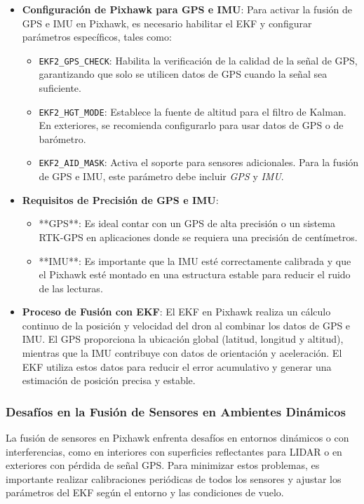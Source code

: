     \begin{itemize}
        \item \textbf{Configuración de Pixhawk para GPS e IMU}: Para activar la fusión de GPS e IMU en Pixhawk, es necesario habilitar el EKF y configurar parámetros específicos, tales como:
            \begin{itemize}
                \item \texttt{EKF2\_GPS\_CHECK}: Habilita la verificación de la calidad de la señal de GPS, garantizando que solo se utilicen datos de GPS cuando la señal sea suficiente.
                \item \texttt{EKF2\_HGT\_MODE}: Establece la fuente de altitud para el filtro de Kalman. En exteriores, se recomienda configurarlo para usar datos de GPS o de barómetro.
                \item \texttt{EKF2\_AID\_MASK}: Activa el soporte para sensores adicionales. Para la fusión de GPS e IMU, este parámetro debe incluir \textit{GPS} y \textit{IMU}.
            \end{itemize}
            
        \item \textbf{Requisitos de Precisión de GPS e IMU}: 
            \begin{itemize}
                \item **GPS**: Es ideal contar con un GPS de alta precisión o un sistema RTK-GPS en aplicaciones donde se requiera una precisión de centímetros.
                \item **IMU**: Es importante que la IMU esté correctamente calibrada y que el Pixhawk esté montado en una estructura estable para reducir el ruido de las lecturas.
            \end{itemize}
            
        \item \textbf{Proceso de Fusión con EKF}: 
            El EKF en Pixhawk realiza un cálculo continuo de la posición y velocidad del dron al combinar los datos de GPS e IMU. El GPS proporciona la ubicación global (latitud, longitud y altitud), mientras que la IMU contribuye con datos de orientación y aceleración. El EKF utiliza estos datos para reducir el error acumulativo y generar una estimación de posición precisa y estable.
    \end{itemize}
    
    \subsubsection{Desafíos en la Fusión de Sensores en Ambientes Dinámicos}
    La fusión de sensores en Pixhawk enfrenta desafíos en entornos dinámicos o con interferencias, como en interiores con superficies reflectantes para LIDAR o en exteriores con pérdida de señal GPS. Para minimizar estos problemas, es importante realizar calibraciones periódicas de todos los sensores y ajustar los parámetros del EKF según el entorno y las condiciones de vuelo.
    
